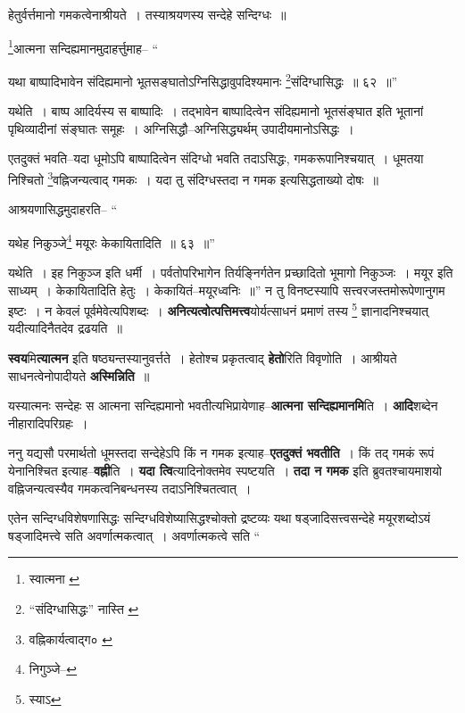 \documentclass[article,12pt,a4paper]{memoir}
\begin{document}
	हेतुर्वर्त्तमानो गमकत्वेनाश्रीयते । तस्याश्रयणस्य सन्देहे सन्दिग्धः ॥ 
	  
	\footnote{स्वात्मना \cite{dp-msA} \cite{dp-msB} \cite{dp-msC} \cite{dp-msD} \cite{dp-edP} \cite{dp-edE} \cite{dp-edH} \cite{dp-edN}}\-आत्मना सन्दिह्यमानमुदाहर्त्तुमाह-- “
	  
	यथा बाष्पादिभावेन संदिह्यमानो भूतसङ्घातोऽग्निसिद्धावुपदिश्यमानः \footnote{“संदिग्धासिद्धः” नास्ति \cite{dp-msC}}\-संदिग्धासिद्धः ॥ ६२ ॥” 
	  
	यथेति । बाष्प आदिर्यस्य स बाष्पादिः । तद्भावेन बाष्पादित्वेन संदिह्यमानो भूतसंङ्घात इति भूतानां पृथिव्यादीनां संङ्घातः समूहः । अग्निसिद्धौ--अग्निसिद्ध्यर्थम् उपादीयमानोऽसिद्धः । 
	  
	एतदुक्तं भवति--यदा धूमोऽपि बाष्पादित्वेन संदिग्धो भवति तदाऽसिद्धः, गमकरूपानिश्चयात् । धूमतया निश्चितो \footnote{वह्निकार्यत्वाद्ग० \cite{dp-msC}}\-वह्निजन्यत्वाद् गमकः । यदा तु संदिग्धस्तदा न गमक इत्यसिद्धताख्यो दोषः ॥ 
	  
	आश्रयणासिद्धमुदाहरति-- “
	  
	यथेह निकुञ्जे\footnote{निगुञ्जे--\cite{dp-msC}} मयूरः केकायितादिति ॥ ६३ ॥” 
	  
	यथेति । इह निकुञ्ज इति धर्मी । पर्वतोपरिभागेन तिर्यङ्निर्गतेन प्रच्छादितो भूमागो निकुञ्जः । मयूर इति साध्यम् । केकायितादिति हेतुः । केकायितं--मयूरध्वनिः ॥” न तु विनष्टस्यापि सत्त्वरजस्तमोरूपेणानुगम इष्टः । न केवलं पूर्वमेवेत्यपिशब्दः । \textbf{अनित्यत्वोत्पत्तिमत्त्व}योर्यत्साधनं प्रमाणं तस्य \footnote{स्याऽ} ज्ञानादनिश्चयात् यदीत्यादिनैतदेव द्रढयति ॥
	\pend
      

	  \pstart \textbf{स्वय}मि\textbf{त्यात्मन} इति षष्ठ्यन्तस्यानुवर्त्तते । हेतोश्च प्रकृतत्वाद् \textbf{हेतो}रिति विवृणोति । आश्रीयते साधनत्वेनोपादीयते \textbf{अस्मिन्निति} ॥
	\pend
      

	  \pstart यस्यात्मनः सन्देहः स आत्मना सन्दिह्यमानो भवतीत्यभिप्रायेणाह--\textbf{आत्मना सन्दिह्यमानमि}ति । \textbf{आदि}शब्देन नीहारादिपरिग्रहः ।
	\pend
      

	  \pstart ननु यद्यसौ परमार्थतो धूमस्तदा सन्देहेऽपि किं न गमक इत्याह--\textbf{एतदुक्तं भवतीति} । किं तद् गमकं रूपं येनानिश्चित इत्याह--\textbf{वह्नी}ति । \textbf{यदा त्वि}त्यादिनोक्तमेव स्पष्टयति । \textbf{तदा न गमक} इति ब्रुवतश्चायमाशयो वह्निजन्यत्वस्यैव गमकत्वनिबन्धनस्य तदाऽनिश्चितत्वात् ।
	\pend
      

	  \pstart एतेन सन्दिग्धविशेषणासिद्धः सन्दिग्धविशेष्यासिद्धश्चोक्तो द्रष्टव्यः \leavevmode{} यथा षड्जादिसत्त्वसन्देहे मयूरशब्दोऽयं षड्जादिमत्त्वे सति अवर्णात्मकत्वात् । अवर्णात्मकत्वे सति  \leavevmode{} “
	  
\end{document}
